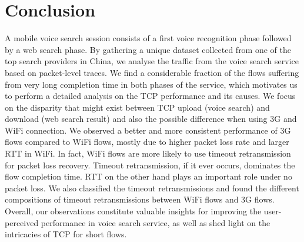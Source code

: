 
\section{Conclusion}
\label{sec:conclude}

A mobile voice search session consists of a first voice recognition phase followed by a web search phase. By gathering a unique dataset collected from one of the top search providers in China, we analyse the traffic from the voice search service based on packet-level traces. We find a considerable fraction of the flows suffering from very long completion time in both phases of the service, which motivates us to perform a detailed analysis on the TCP performance and its causes. We focus on the disparity that might exist between TCP upload (voice search) and download (web search result) and also the possible difference when using 3G and WiFi connection. We observed a better and more consistent performance of 3G flows compared to WiFi flows, mostly due to higher packet loss rate and larger RTT in WiFi. In fact, WiFi flows are more likely to use timeout retransmission for packet loss recovery. Timeout retransmission, if it ever occurs, dominates the flow completion time. RTT on the other hand plays an important role under no packet loss. We also classified the timeout retransmissions and found the different compositions of timeout retransmissions between WiFi flows and 3G flows. Overall, our observations constitute valuable insights for improving the user-perceived performance in voice search service, as well as shed light on the intricacies of TCP for short flows.

